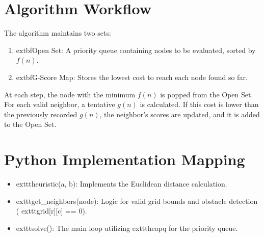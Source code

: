 \documentclass[12pt]{article}
\begin{document}
\section{Algorithm Workflow}
The algorithm maintains two sets:
\begin{enumerate}
    \item 	extbf{Open Set}: A priority queue containing nodes to be evaluated, sorted by $f(n)$.
    \item 	extbf{G-Score Map}: Stores the lowest cost to reach each node found so far.
\end{enumerate}

At each step, the node with the minimum $f(n)$ is popped from the Open Set. For each valid neighbor, a tentative $g(n)$ is calculated. If this cost is lower than the previously recorded $g(n)$, the neighbor's scores are updated, and it is added to the Open Set.

\section{Python Implementation Mapping}
\begin{itemize}
    \item 	exttt{heuristic(a, b)}: Implements the Euclidean distance calculation.
    \item 	exttt{get\_neighbors(node)}: Logic for valid grid bounds and obstacle detection (	exttt{grid[r][c] == 0}).
    \item 	exttt{solve()}: The main loop utilizing 	exttt{heapq} for the priority queue.
\end{itemize}
\end{document}
